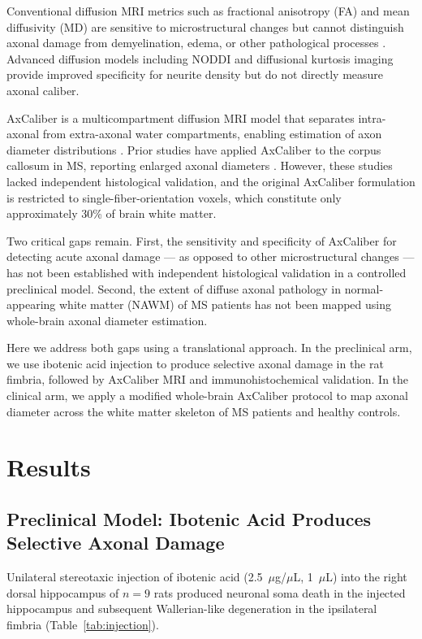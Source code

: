 \documentclass[11pt]{article}
\begin{document}
Conventional diffusion MRI metrics such as fractional anisotropy (FA) and mean diffusivity (MD) are sensitive to microstructural changes but cannot distinguish axonal damage from demyelination, edema, or other pathological processes \citep{alexander2010diffusion, budde2009quantification}. Advanced diffusion models including NODDI \citep{zhang2012noddi} and diffusional kurtosis imaging \citep{fieremans2011white} provide improved specificity for neurite density but do not directly measure axonal caliber.

AxCaliber is a multicompartment diffusion MRI model that separates intra-axonal from extra-axonal water compartments, enabling estimation of axon diameter distributions \citep{assaf2008axcaliber, barazany2009vivo}. Prior studies have applied AxCaliber to the corpus callosum in MS, reporting enlarged axonal diameters \citep{huang2015corpus}. However, these studies lacked independent histological validation, and the original AxCaliber formulation is restricted to single-fiber-orientation voxels, which constitute only approximately 30\% of brain white matter.

Two critical gaps remain. First, the sensitivity and specificity of AxCaliber for detecting acute axonal damage --- as opposed to other microstructural changes --- has not been established with independent histological validation in a controlled preclinical model. Second, the extent of diffuse axonal pathology in normal-appearing white matter (NAWM) of MS patients has not been mapped using whole-brain axonal diameter estimation.

Here we address both gaps using a translational approach. In the preclinical arm, we use ibotenic acid injection to produce selective axonal damage in the rat fimbria, followed by AxCaliber MRI and immunohistochemical validation. In the clinical arm, we apply a modified whole-brain AxCaliber protocol to map axonal diameter across the white matter skeleton of MS patients and healthy controls.

\section{Results}

\subsection{Preclinical Model: Ibotenic Acid Produces Selective Axonal Damage}

Unilateral stereotaxic injection of ibotenic acid (2.5~$\mu$g/$\mu$L, 1~$\mu$L) into the right dorsal hippocampus of $n = 9$ rats produced neuronal soma death in the injected hippocampus and subsequent Wallerian-like degeneration in the ipsilateral fimbria (Table~\ref{tab:injection}).
\end{document}
